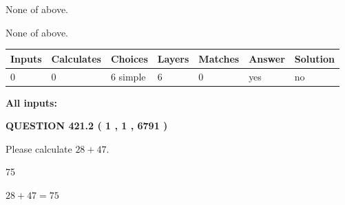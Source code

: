 \documentclass[12pt]{article}
\begin{document}
 
 None of above.
 
 
\noindent{}
 
 
 None of above.
 
 
\noindent{}
 
 
   
   
   
   
\noindent\begin{tabular}{|l|l|l|l|l|l|l|}
 \hline
Inputs & Calculates & Choices & Layers & Matches & Answer & Solution \\ \hline
 0  & 
 0  & 
 6
  simple  
  & 
 6  & 
 0  & 
  yes & 
  no 
  \\ \hline
 \end{tabular}
   
   
   
   
\noindent{}
   
   
   
   
\noindent\vspace{0.1in}\hspace{-0.08in} {\textbf{\Large{All inputs: }}}
   
   
  
\vspace{0.2in}
  
{\textbf{\Large{QUESTION
421.2 
 ( 1 , 1 , 6791 )
}}}
  
  
 
Please calculate $ %
28 +  %
47 $.
 
 
 
\noindent{}
 
 

75
 
 
\noindent{}
 
 

 
 
 
\noindent{}
 
 

$ %
28 +  %
47=   %
75$
 
 
\noindent{}
 
\end{document}
